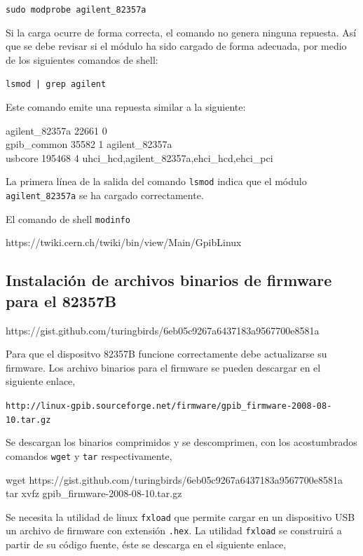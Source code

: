 \documentclass[paper=letter,oneside,fontsize=11pt, parskip=full]{scrartcl}
\newcommand{\code}[1]{{\ttfamily #1}}
\begin{document}
		\texttt{sudo modprobe agilent\_82357a}
		
		Si la carga ocurre de forma correcta, el comando no genera ninguna repuesta. Así que se debe revisar si el módulo ha sido cargado de forma adecuada, por medio de los siguientes comandos de shell:
		
		\texttt{lsmod | grep agilent}
		
		Este comando emite una repuesta similar a la siguiente:

		\code{	
			agilent\_82357a	22661  0 \\				
			gpib\_common	35582  1 agilent\_82357a  \\				
			usbcore	195468  4 uhci\_hcd,agilent\_82357a,ehci\_hcd,ehci\_pci \\
		}
		
		La primera línea de la salida del comando \texttt{lsmod} indica que el módulo \texttt{agilent\_82357a} se ha cargado correctamente. 	
		
		El comando de shell \texttt{modinfo} 
		
		https://twiki.cern.ch/twiki/bin/view/Main/GpibLinux
		
		\subsection{Instalación de archivos binarios de firmware para el 82357B}
		
		https://gist.github.com/turingbirds/6eb05c9267a6437183a9567700e8581a
		
		Para que el dispositvo 82357B funcione correctamente debe actualizarse su firmware. Los archivo binarios para el firmware se pueden descargar en el siguiente enlace, 
		
		\texttt{http://linux-gpib.sourceforge.net/firmware/gpib\_firmware-2008-08-10.tar.gz}
		
		Se descargan los binarios comprimidos y se descomprimen, con los acostumbrados comandos \texttt{wget} y \texttt{tar} respectivamente,
		
		\code{
			wget 		https://gist.github.com/turingbirds/6eb05c9267a6437183a9567700e8581a \\ 		
			tar xvfz gpib\_firmware-2008-08-10.tar.gz 
		}
		
		Se necesita la utilidad de linux \texttt{fxload} que permite cargar en un dispositivo USB un archivo de firmware con extensión \texttt{.hex}. La utilidad \texttt{fxload} se construirá a partir de su código fuente, éste se descarga en el siguiente enlace,
		
\end{document}
